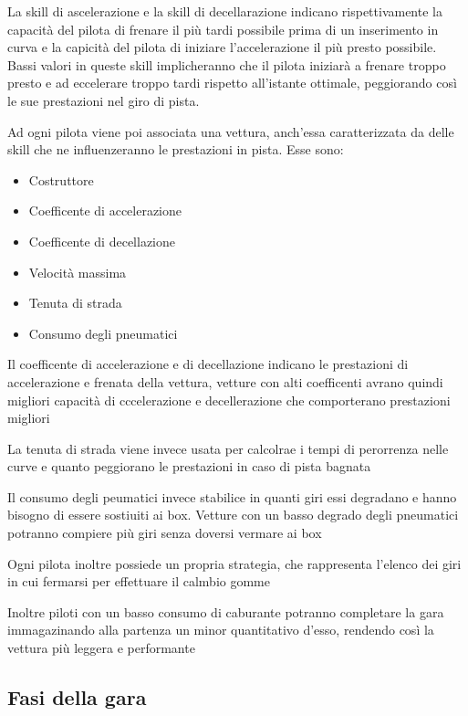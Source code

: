 \documentclass[a4paper,11pt, twoside]{book}
\begin{document}
      La skill di ascelerazione e la skill di decellarazione indicano rispettivamente la capacità del pilota di frenare 
      il più tardi possibile prima di un inserimento in curva e la capicità del pilota di iniziare l'accelerazione 
      il più presto possibile. Bassi valori in queste skill implicheranno che il pilota iniziarà a frenare troppo presto 
      e ad eccelerare troppo tardi rispetto all'istante ottimale, peggiorando così le sue prestazioni nel giro di pista.
      
      Ad ogni pilota viene poi associata una vettura, anch'essa caratterizzata da delle skill che ne influenzeranno
      le prestazioni in pista. Esse sono:
      
      \begin{itemize}
	\item Costruttore
	\item Coefficente di accelerazione
	\item Coefficente di decellazione
	\item Velocità massima
	\item Tenuta di strada
	\item Consumo degli pneumatici
      \end{itemize}
      
      Il coefficente di accelerazione e di decellazione indicano le prestazioni di accelerazione e frenata della vettura, 
      vetture con alti coefficenti avrano quindi migliori capacità di cccelerazione e decellerazione
      che comporterano prestazioni migliori
      
      La tenuta di strada viene invece usata per calcolrae i tempi di perorrenza nelle curve e quanto peggiorano 
      le prestazioni in caso di pista bagnata
      
      Il consumo degli peumatici invece stabilice in quanti giri essi degradano e hanno bisogno di essere sostiuiti
      ai box. Vetture con un basso degrado degli pneumatici potranno compiere più giri senza doversi vermare ai box
      
      Ogni pilota inoltre possiede un propria strategia, che rappresenta l'elenco dei giri in cui fermarsi per effettuare il
      calmbio gomme
      
      Inoltre piloti con un basso consumo di caburante potranno completare la gara immagazinando alla partenza un minor
      quantitativo d'esso, rendendo così la vettura più leggera e performante
      
      \subsection{Fasi della gara}
\end{document}
